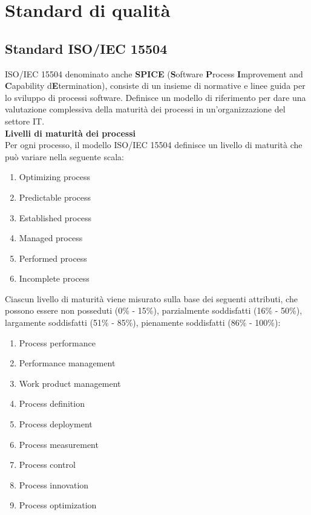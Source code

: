 \section{Standard di qualità} 
\subsection{Standard ISO/IEC 15504}\label{AppQualitaProcessi}
ISO/IEC 15504 denominato anche \textbf{SPICE} (\textbf{S}oftware \textbf{P}rocess \textbf{I}mprovement and \textbf{C}apability d\textbf{E}termination), consiste di un insieme di normative e linee guida per lo sviluppo di processi software.
Definisce un modello di riferimento per dare una valutazione complessiva della maturità dei processi in un'organizzazione del settore IT.\\
\textbf{Livelli di maturità dei processi}\\
Per ogni processo, il modello ISO/IEC 15504 definisce un livello di maturità che può variare nella seguente scala:
\begin{enumerate}
\item Optimizing process
\item Predictable process
\item Established process
\item Managed process
\item Performed process
\item Incomplete process
\end{enumerate}
Ciascun livello di maturità viene misurato sulla base dei seguenti attributi, che possono essere non posseduti (0\% - 15\%), parzialmente soddisfatti (16\% - 50\%), largamente soddisfatti (51\% - 85\%), pienamente soddisfatti (86\% - 100\%):
\begin{enumerate}
\item Process performance
\item Performance management
\item Work product management
\item Process definition
\item Process deployment
\item Process measurement
\item Process control
\item Process innovation
\item Process optimization
\end{enumerate}
